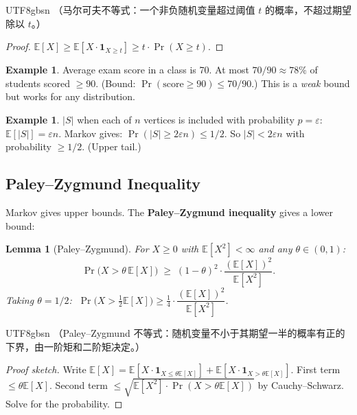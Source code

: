 \documentclass[12pt]{article}
\newtheorem{lemma}[theorem]{Lemma}
\theoremstyle{definition}
\newtheorem{example}[theorem]{Example}
\theoremstyle{remark}
\begin{document}
\begin{CJK}{UTF8}{gbsn}
（马尔可夫不等式：一个非负随机变量超过阈值 $t$ 的概率，不超过期望除以 $t$。）
\end{CJK}

\begin{proof}
$\mathbb{E}[X] \ge \mathbb{E}[X \cdot \mathbf{1}_{X \ge t}] \ge t \cdot \Pr(X \ge t)$.
\end{proof}

\begin{example}
Average exam score in a class is 70.  At most $70/90 \approx 78\%$ of students scored $\ge 90$.
(Bound: $\Pr(\text{score} \ge 90) \le 70/90$.)
This is a \emph{weak} bound but works for any distribution.
\end{example}

\begin{example}
$|S|$ when each of $n$ vertices is included with probability $p = \varepsilon$:
$\mathbb{E}[|S|] = \varepsilon n$.  Markov gives: $\Pr(|S| \ge 2\varepsilon n) \le 1/2$.
So $|S| < 2\varepsilon n$ with probability $\ge 1/2$.  (Upper tail.)
\end{example}

\subsection{Paley--Zygmund Inequality}

Markov gives upper bounds.  The \textbf{Paley--Zygmund inequality} gives a lower bound:

\begin{lemma}[Paley--Zygmund]\label{lem:pz}
For $X \ge 0$ with $\mathbb{E}[X^2] < \infty$ and any $\theta \in (0,1)$:
\[
  \Pr\!\bigl(X > \theta\,\mathbb{E}[X]\bigr)
  \;\ge\; (1-\theta)^2 \cdot \frac{(\mathbb{E}[X])^2}{\mathbb{E}[X^2]}.
\]
Taking $\theta = 1/2$: $\;\Pr\!\bigl(X > \tfrac{1}{2}\mathbb{E}[X]\bigr) \ge
\tfrac{1}{4} \cdot \dfrac{(\mathbb{E}[X])^2}{\mathbb{E}[X^2]}$.
\end{lemma}

\begin{CJK}{UTF8}{gbsn}
（Paley--Zygmund 不等式：随机变量不小于其期望一半的概率有正的下界，由一阶矩和二阶矩决定。）
\end{CJK}

\begin{proof}[Proof sketch]
Write $\mathbb{E}[X] = \mathbb{E}[X \cdot \mathbf{1}_{X \le \theta\mathbb{E}[X]}]
+ \mathbb{E}[X \cdot \mathbf{1}_{X > \theta\mathbb{E}[X]}]$.
First term $\le \theta\mathbb{E}[X]$.
Second term $\le \sqrt{\mathbb{E}[X^2] \cdot \Pr(X > \theta\mathbb{E}[X])}$ by Cauchy--Schwarz.
Solve for the probability.
\end{proof}
\end{document}

